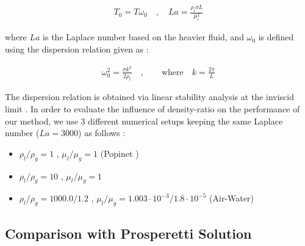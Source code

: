 \begin{align}
	T_0 = T \omega_0 \quad , \quad La = \frac{\rho_l \sigma L}{\mu_l^2}  
\end{align}

where $La$ is the Laplace number based on the heavier fluid, and $\omega_0$ is defined using the dispersion relation \cite{popinet2009accurate} given as : 

\begin{align}
	\omega_0^2 =  \frac{\sigma k^3}{2 \rho_l} \quad, \qquad \text{where} \quad k = \frac{2\pi}{L}   
\end{align}

The dispersion relation is obtained via linear stability analysis at the inviscid limit \cite{lamb1993hydrodynamics}. In order to evaluate the influence of density-ratio on the performance of our method, we use 3 different numerical setups keeping the same Laplace number ($La = 3000$) as follows : 

\begin{itemize}
	\item $\rho_l/\rho_g = 1$ , $\mu_l/\mu_g = 1$  (Popinet \cite{popinet2009accurate}) 
	\item $\rho_l/\rho_g = 10$ , $\mu_l/\mu_g = 1$   
	\item $\rho_l/\rho_g = 1000.0/1.2$ , $\mu_l/\mu_g = 1.003\cdot 10^{-3}/1.8\cdot 10^{-5}$ (Air-Water) 
\end{itemize}


\subsection*{Comparison with Prosperetti Solution}

\blindtext

